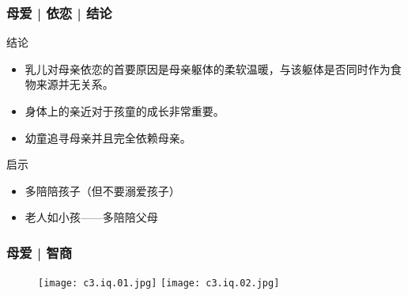\begin{frame}
  \frametitle{母爱 | 依恋 | 结论}
  \begin{block}{结论}
    \begin{itemize}
      \item 乳儿对母亲依恋的首要原因是母亲躯体的柔软温暖，与该躯体是否同时作为食物来源并无关系。
      \item 身体上的亲近对于孩童的成长非常重要。
      \item 幼童追寻母亲并且完全依赖母亲。
    \end{itemize}
  \end{block}
  \pause
  \begin{block}{启示}
    \begin{itemize}
      \item 多陪陪孩子（但不要溺爱孩子）
      \item 老人如小孩——多陪陪父母
    \end{itemize}
  \end{block}
\end{frame}

\begin{frame}
  \frametitle{母爱 | 智商}
  \begin{figure}
    \centering
    \texttt{[image: c3.iq.01.jpg]}
    \texttt{[image: c3.iq.02.jpg]}
  \end{figure}
\end{frame}

